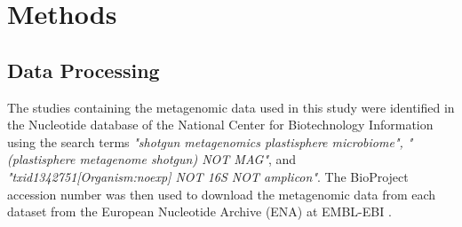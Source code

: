 \chapter{Methods}
% 
%



\section{Data Processing}
The studies containing the metagenomic data used in this study were identified in the Nucleotide database of the National Center for Biotechnology Information using the search terms \emph{"shotgun metagenomics plastisphere microbiome", "(plastisphere metagenome shotgun) NOT MAG"}, and \emph{"txid1342751[Organism:noexp] NOT 16S NOT amplicon"}. The BioProject accession number was then used to download the metagenomic data from each dataset from the European Nucleotide Archive (ENA) at EMBL-EBI \cite{embl-ebi2025ENABrowser}. 

